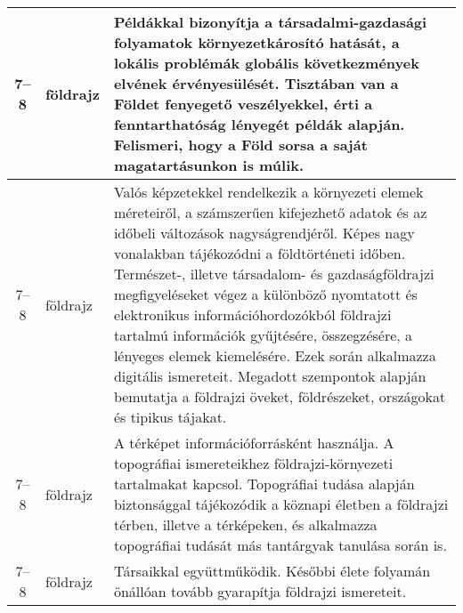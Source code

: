 \begin{small}
\begin{longtable}{c | p{2cm} |  p{11cm} }
              7--8 & földrajz & Példákkal bizonyítja a társadalmi-gazdasági folyamatok környezetkárosító hatását, a lokális problémák globális következmények elvének érvényesülését. Tisztában van a Földet fenyegető veszélyekkel, érti a fenntarthatóság lényegét példák alapján. Felismeri, hogy a Föld sorsa a saját magatartásunkon is múlik. \\ \hline
              7--8 & földrajz & Valós képzetekkel rendelkezik a környezeti elemek méreteiről, a számszerűen kifejezhető adatok és az időbeli változások nagyságrendjéről. Képes nagy vonalakban tájékozódni a földtörténeti időben. Természet-, illetve társadalom- és gazdaságföldrajzi megfigyeléseket végez a különböző nyomtatott és elektronikus információhordozókból földrajzi tartalmú információk gyűjtésére, összegzésére, a lényeges elemek kiemelésére. Ezek során alkalmazza digitális ismereteit. Megadott szempontok alapján bemutatja a földrajzi öveket, földrészeket, országokat és tipikus tájakat. \\ \hline
              7--8 & földrajz & A térképet információforrásként használja. A topográfiai ismereteikhez földrajzi-környezeti tartalmakat kapcsol. Topográfiai tudása alapján biztonsággal tájékozódik a köznapi életben a földrajzi térben, illetve a térképeken, és alkalmazza topográfiai tudását más tantárgyak tanulása során is. \\ \hline
              7--8 & földrajz & Társaikkal együttműködik. Későbbi élete folyamán önállóan tovább gyarapítja földrajzi ismereteit. \\ \hline
      \end{longtable}
\end{small}


